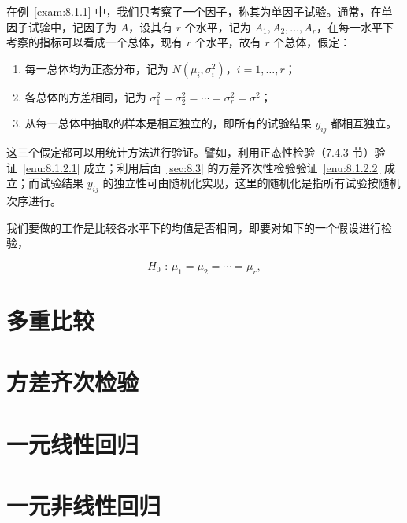在例~\ref{exam:8.1.1} 中，我们只考察了一个因子，称其为单因子试验。通常，在单因子试验中，记因子为 $A$，设其有 $r$ 个水平，记为 $A_1,A_2,\ldots,A_r$，在每一水平下考察的指标可以看成一个总体，现有 $r$ 个水平，故有 $r$ 个总体，假定：

\begin{enumerate}
  \item 每一总体均为正态分布，记为 $N(\mu_i, \sigma_i^2)$，$i=1,\ldots,r$；\label{enu:8.1.2.1}
  \item 各总体的方差相同，记为 $\sigma_1^2 = \sigma_2^2=\cdots=\sigma_r^2=\sigma^2$；\label{enu:8.1.2.2}
  \item 从每一总体中抽取的样本是相互独立的，即所有的试验结果 $y_{ij}$ 都相互独立。
\end{enumerate}

这三个假定都可以用统计方法进行验证。譬如，利用正态性检验（7.4.3 节）验证~\ref{enu:8.1.2.1} 成立；利用后面~\ref{sec:8.3} 的方差齐次性检验验证~\ref{enu:8.1.2.2} 成立；而试验结果 $y_{ij}$ 的独立性可由随机化实现，这里的随机化是指所有试验按随机次序进行。

我们要做的工作是比较各水平下的均值是否相同，即要对如下的一个假设进行检验，

\begin{equation}
  H_0 \textrm{ : } \mu_1 = \mu_2 = \cdots = \mu_r,
\end{equation}



\section{多重比较\label{sec:8.2}}

\section{方差齐次检验\label{sec:8.3}}

\section{一元线性回归\label{sec:8.4}}

\section{一元非线性回归\label{sec:8.5}}